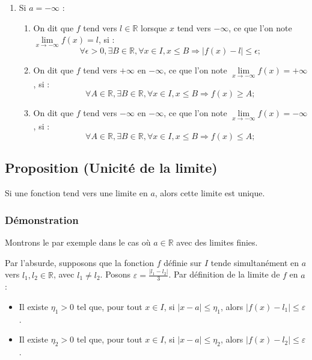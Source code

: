\documentclass{article}
\begin{document}
\begin{enumerate}
			\item Si $a = -\infty$ :
			\begin{enumerate}
				\item On dit que $f$ tend vers $l \in \mathbb{R}$ lorsque $x$ tend vers $-\infty$, ce que l’on note $\lim\limits_{x \to -\infty} f(x) = l$, si :
				\[
				\forall \epsilon > 0, \exists B \in \mathbb{R}, \forall x \in I, x \leq B \Rightarrow |f(x) - l| \leq \epsilon;
				\]
				\item On dit que $f$ tend vers $+\infty$ en $-\infty$, ce que l’on note $\lim\limits_{x \to -\infty} f(x) = +\infty$, si :
				\[
				\forall A \in \mathbb{R}, \exists B \in \mathbb{R}, \forall x \in I, x \leq B \Rightarrow f(x) \geq A;
				\]
				\item On dit que $f$ tend vers $-\infty$ en $-\infty$, ce que l’on note $\lim\limits_{x \to -\infty} f(x) = -\infty$, si :
				\[
				\forall A \in \mathbb{R}, \exists B \in \mathbb{R}, \forall x \in I, x \leq B \Rightarrow f(x) \leq A;
				\]
			\end{enumerate}
		\end{enumerate}
	\subsection{Proposition (Unicité de la limite)}
	
	Si une fonction tend vers une limite en $a$, alors cette limite est unique.
	
	\subsubsection*{Démonstration}
	
	Montrons le par exemple dans le cas où $a \in \mathbb{R}$ avec des limites finies.
	
	Par l'absurde, supposons que la fonction $f$ définie sur $I$ tende simultanément en $a$ vers $l_1, l_2 \in \mathbb{R}$, avec $l_1 \neq l_2$. Posons $\varepsilon = \frac{|l_1 - l_2|}{3}$. Par définition de la limite de $f$ en $a$ :
	
	\begin{itemize}
		\item Il existe $\eta_1 > 0$ tel que, pour tout $x \in I$, si $|x - a| \leq \eta_1$, alors $|f(x) - l_1| \leq \varepsilon$.
		\item Il existe $\eta_2 > 0$ tel que, pour tout $x \in I$, si $|x - a| \leq \eta_2$, alors $|f(x) - l_2| \leq \varepsilon$.
	\end{itemize}
	
\end{document}
